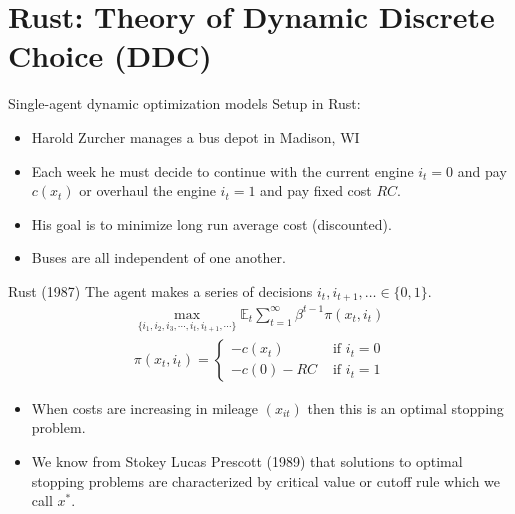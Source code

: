 \documentclass[xcolor=pdftex,dvipsnames,table,mathserif,aspectratio=169]{beamer}
\begin{document}
\section{Rust: Theory of Dynamic Discrete Choice (DDC)}

\begin{frame}{Single-agent dynamic optimization models}
Setup in Rust:
\begin{itemize}
\item Harold Zurcher manages a bus depot in Madison, WI
\item Each week he must decide to continue with the current engine $i_t=0$ and pay $c(x_{t})$ or overhaul the engine $i_t=1$ and pay fixed cost $RC$.
\item His goal is to minimize \alert{long run average cost} (discounted).
\item Buses are all  \alert{independent} of one another.
\end{itemize}
\end{frame}




\begin{frame}{Rust (1987)}
The agent makes a series of decisions $i_t,i_{t+1},\ldots \in \{0,1\}$.
\begin{eqnarray*}
\max_{\{i_1, i_2, i_3, \cdots, i_t, i_{t+1}, \cdots \}} \mathbb{E}_t \sum^{\infty}_{t=1} \beta^{t-1} \pi (x_t,i_t)\\
\pi \left(x_{t},i_{t} \right)=
		\begin{cases}
		-c\left(x_{t} \right)  & \mbox{ if }i_{t}=0\\		
		 -c\left(0\right) -RC& \mbox{ if }i_{t}=1
		\end{cases}
\end{eqnarray*}
\begin{itemize}
\item When costs are increasing in mileage $(x_{it})$ then this is an \alert{optimal stopping problem}.
\item We know from Stokey Lucas Prescott (1989) that solutions to optimal stopping problems are characterized by \alert{critical value} or \alert{cutoff rule} which we call $x^*$.
\end{itemize}
\end{frame}
\end{document}
